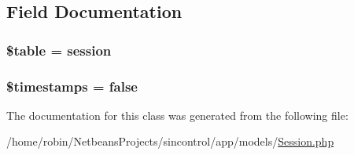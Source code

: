 \subsection{Field Documentation}
\hypertarget{class_session_ae8876a14058f368335baccf35af4a22b}{}
\subsubsection[{\$table}]{\setlength{\rightskip}{0pt plus 5cm}\$table = \textquotesingle{}session\textquotesingle{}\hspace{0.3cm}{\ttfamily [protected]}}\label{class_session_ae8876a14058f368335baccf35af4a22b}
\hypertarget{class_session_a51267c24c8fae742ed8f9be0ba6085ee}{}
\subsubsection[{\$timestamps}]{\setlength{\rightskip}{0pt plus 5cm}\$timestamps = false}\label{class_session_a51267c24c8fae742ed8f9be0ba6085ee}


The documentation for this class was generated from the following file\+:\begin{DoxyCompactItemize}
\item 
/home/robin/\+Netbeans\+Projects/sincontrol/app/models/\hyperlink{_session_8php}{Session.\+php}\end{DoxyCompactItemize}
